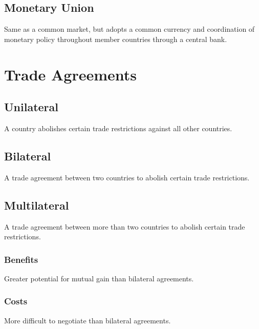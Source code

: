 \documentclass[a4paper,11pt]{article}
\begin{document}
\subsection{Monetary Union}

Same as a common market, but adopts a common currency and coordination of
monetary policy throughout member countries through a central bank.




\section{Trade Agreements}

\subsection{Unilateral}

A country abolishes certain trade restrictions against all other countries.


\subsection{Bilateral}

A trade agreement between two countries to abolish certain trade restrictions.


\subsection{Multilateral}

A trade agreement between more than two countries to abolish certain trade
restrictions.


\subsubsection{Benefits}

Greater potential for mutual gain than bilateral agreements.


\subsubsection{Costs}

More difficult to negotiate than bilateral agreements.
\end{document}
